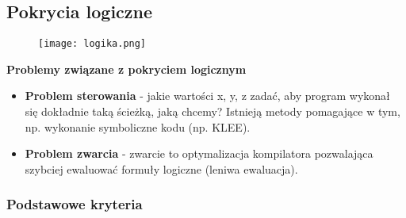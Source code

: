 \documentclass[../main.tex]{subfiles}
\begin{document}
    \subsection{Pokrycia logiczne}

    \begin{figure}[H]
        \texttt{[image: logika.png]}
    \end{figure}

    \textbf{Problemy związane z pokryciem logicznym}
    \begin{itemize}
        \item \textbf{Problem sterowania} - jakie wartości x, y, z zadać, aby program wykonał się dokładnie taką ścieżką,
        jaką chcemy? Istnieją metody pomagające w tym, np. wykonanie symboliczne kodu (np. KLEE).


        \item \textbf{Problem zwarcia} - zwarcie to optymalizacja kompilatora pozwalająca szybciej ewaluować
        formuły logiczne (leniwa ewaluacja).
    \end{itemize}
    \subsubsection{Podstawowe kryteria}
\end{document}
